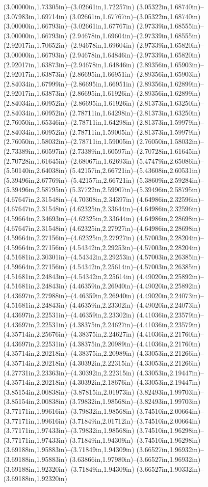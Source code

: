 (3.00000in,1.73305in)--(3.02661in,1.72257in) (3.05322in,1.68740in)--(3.07983in,1.69714in) (3.02661in,1.67767in)--(3.05322in,1.68740in) (3.00000in,1.66793in)--(3.02661in,1.67767in) (2.97339in,1.68555in)--(3.00000in,1.66793in) (2.94678in,1.69604in)--(2.97339in,1.68555in) (2.92017in,1.70652in)--(2.94678in,1.69604in) (2.97339in,1.65820in)--(3.00000in,1.66793in) (2.94678in,1.64846in)--(2.97339in,1.65820in) (2.92017in,1.63873in)--(2.94678in,1.64846in) (2.89356in,1.65903in)--(2.92017in,1.63873in) (2.86695in,1.66951in)--(2.89356in,1.65903in) (2.84034in,1.67999in)--(2.86695in,1.66951in) (2.89356in,1.62899in)--(2.92017in,1.63873in) (2.86695in,1.61926in)--(2.89356in,1.62899in) (2.84034in,1.60952in)--(2.86695in,1.61926in) (2.81373in,1.63250in)--(2.84034in,1.60952in) (2.78711in,1.64298in)--(2.81373in,1.63250in) (2.76050in,1.65346in)--(2.78711in,1.64298in) (2.81373in,1.59979in)--(2.84034in,1.60952in) (2.78711in,1.59005in)--(2.81373in,1.59979in) (2.76050in,1.58032in)--(2.78711in,1.59005in) (2.76050in,1.58032in)--(2.73389in,1.60597in) (2.73389in,1.60597in)--(2.70728in,1.61645in) (2.70728in,1.61645in)--(2.68067in,1.62693in) (5.47479in,2.65086in)--(5.50140in,2.64038in) (5.42157in,2.66721in)--(5.43608in,2.60531in) (5.39496in,2.67769in)--(5.42157in,2.66721in) (5.38609in,2.59284in)--(5.39496in,2.58795in) (5.37722in,2.59907in)--(5.39496in,2.58795in) (4.67647in,2.31548in)--(4.70308in,2.34397in) (4.64986in,2.32596in)--(4.67647in,2.31548in) (4.62325in,2.33644in)--(4.64986in,2.32596in) (4.59664in,2.34693in)--(4.62325in,2.33644in) (4.64986in,2.28698in)--(4.67647in,2.31548in) (4.62325in,2.27927in)--(4.64986in,2.28698in) (4.59664in,2.27156in)--(4.62325in,2.27927in) (4.57003in,2.28204in)--(4.59664in,2.27156in) (4.54342in,2.29253in)--(4.57003in,2.28204in) (4.51681in,2.30301in)--(4.54342in,2.29253in) (4.57003in,2.26385in)--(4.59664in,2.27156in) (4.54342in,2.25614in)--(4.57003in,2.26385in) (4.51681in,2.24843in)--(4.54342in,2.25614in) (4.49020in,2.25892in)--(4.51681in,2.24843in) (4.46359in,2.26940in)--(4.49020in,2.25892in) (4.43697in,2.27988in)--(4.46359in,2.26940in) (4.49020in,2.24073in)--(4.51681in,2.24843in) (4.46359in,2.23302in)--(4.49020in,2.24073in) (4.43697in,2.22531in)--(4.46359in,2.23302in) (4.41036in,2.23579in)--(4.43697in,2.22531in) (4.38375in,2.24627in)--(4.41036in,2.23579in) (4.35714in,2.25676in)--(4.38375in,2.24627in) (4.41036in,2.21760in)--(4.43697in,2.22531in) (4.38375in,2.20989in)--(4.41036in,2.21760in) (4.35714in,2.20218in)--(4.38375in,2.20989in) (4.33053in,2.21266in)--(4.35714in,2.20218in) (4.30392in,2.22315in)--(4.33053in,2.21266in) (4.27731in,2.23363in)--(4.30392in,2.22315in) (4.33053in,2.19447in)--(4.35714in,2.20218in) (4.30392in,2.18676in)--(4.33053in,2.19447in) (3.85154in,2.00838in)--(3.87815in,2.01973in) (3.82493in,1.99703in)--(3.85154in,2.00838in) (3.79832in,1.98568in)--(3.82493in,1.99703in) (3.77171in,1.99616in)--(3.79832in,1.98568in) (3.74510in,2.00664in)--(3.77171in,1.99616in) (3.71849in,2.01712in)--(3.74510in,2.00664in) (3.77171in,1.97433in)--(3.79832in,1.98568in) (3.74510in,1.96298in)--(3.77171in,1.97433in) (3.71849in,1.94309in)--(3.74510in,1.96298in) (3.69188in,1.95883in)--(3.71849in,1.94309in) (3.66527in,1.96932in)--(3.69188in,1.95883in) (3.63866in,1.97980in)--(3.66527in,1.96932in) (3.69188in,1.92320in)--(3.71849in,1.94309in) (3.66527in,1.90332in)--(3.69188in,1.92320in) 